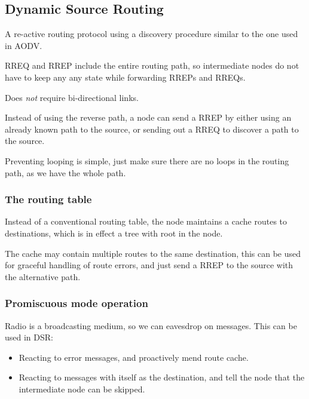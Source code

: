 	\subsection{Dynamic Source Routing}
	A re-active routing protocol using a discovery procedure similar to the one used in AODV.
	
	\gls{RREQ} and \gls{RREP} include the entire routing path, so intermediate nodes do not have to keep any any state while forwarding \glspl{RREP} and \glspl{RREQ}.
	
	Does \textit{not} require bi-directional links.
	
	Instead of using the reverse path, a node can send a \gls{RREP} by either using an already known path to the source, or sending out a \gls{RREQ} to discover a path to the source.
	
	Preventing looping is simple, just make sure there are no loops in the routing path, as we have the whole path.
	
	\subsubsection{The routing table}
	Instead of a conventional routing table, the node maintains a cache routes to destinations, which is in effect a tree with root in the node.
	
	The cache may contain multiple routes to the same destination, this can be used for graceful handling of route errors, and just send a \gls{RREP} to the source with the alternative path.
	
	\subsubsection{Promiscuous mode operation}
	Radio is a broadcasting medium, so we can eavesdrop on messages. This can be used in DSR:
	\begin{itemize}
		\item Reacting to error messages, and proactively mend route cache.
		\item Reacting to messages with itself as the destination, and tell the node that the intermediate node can be skipped.
	\end{itemize}
	
